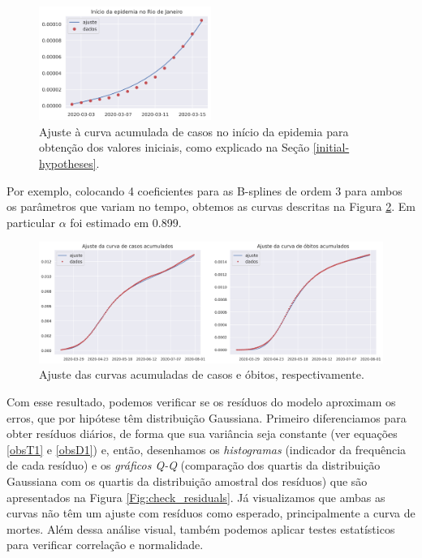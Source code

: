 \begin{figure}
    \centering
    \includegraphics[width=0.5\textwidth]{../images/initial_values.png}
    \caption{Ajuste à curva acumulada de casos no início da epidemia para obtenção dos valores iniciais, como explicado na Seção \ref{initial-hypotheses}.}
    \label{Fig:initial-values}
\end{figure}

Por exemplo, colocando 4 coeficientes para as B-splines de ordem 3 para ambos
os parâmetros que variam no tempo, obtemos as curvas
descritas na Figura \ref{Fig:cumulated-curves}. Em particular $\alpha$ foi estimado em 0.899. 

\begin{figure}[H]
    \centering
    \includegraphics[width=\textwidth]{../images/cumulated_fitted_curves.png}
    \caption{Ajuste das curvas acumuladas de casos e óbitos, respectivamente.}
    \label{Fig:cumulated-curves}
\end{figure}

Com esse resultado, podemos verificar se os resíduos do modelo aproximam os erros, que por hipótese têm distribuição Gaussiana. 
Primeiro diferenciamos para obter resíduos diários, de forma que sua variância seja constante (ver equações \eqref{obsT1} e \eqref{obsD1}) e, então, desenhamos os {\em histogramas} (indicador da frequência de cada resíduo) e os {\em gráficos Q-Q} (comparação dos quartis da distribuição Gaussiana com os quartis da distribuição amostral dos resíduos) que são apresentados na Figura
\ref{Fig:check_residuals}. 
Já visualizamos que ambas as curvas não têm um ajuste com resíduos como esperado, principalmente a curva de mortes. 
Além dessa análise visual, também podemos aplicar testes estatísticos  para verificar correlação e normalidade.  

